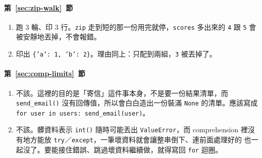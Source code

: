 \paragraph{第~\ref{sec:zip-walk}~節}
\begin{enumerate}
\item 跑 3 輪、印 3 行。\texttt{zip} 走到短的那一份用完就停，\texttt{scores} 多出來的
\texttt{4} 跟 \texttt{5} 會被安靜地丟掉，不會報錯。
\item 印出 \texttt{\{'a': 1, 'b': 2\}}。理由同上：只配到兩組，\texttt{3} 被丟掉了。
\end{enumerate}

\paragraph{第~\ref{sec:comp-limits}~節}
\begin{enumerate}
\item 不該。這裡的目的是「寄信」這件事本身，不是要一份結果清單，而
\texttt{send\_email()} 沒有回傳值，所以會白白造出一份裝滿 \texttt{None} 的清單。應該寫成
\texttt{for user in users: send\_email(user)}。
\item 不該。髒資料表示 \texttt{int()} 隨時可能丟出 \texttt{ValueError}，而 comprehension
裡沒有地方能放 \texttt{try}／\texttt{except}，一筆壞資料就會讓整串倒下、連前面處理好的
也一起沒了。要能接住錯誤、跳過壞資料繼續做，就得寫回 \texttt{for} 迴圈。
\end{enumerate}
